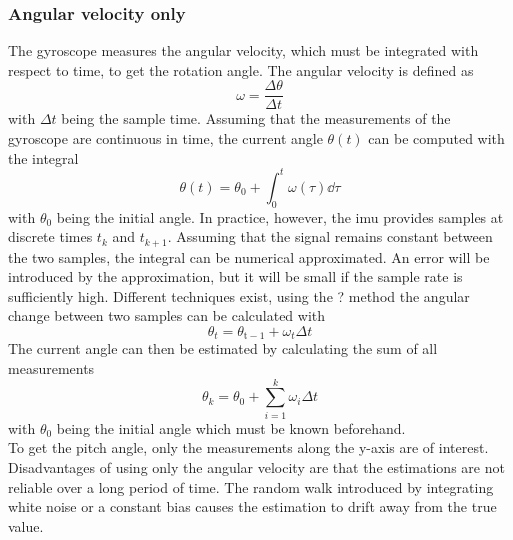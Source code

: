 \subsubsection{Angular velocity only}
\cite{Kok2017}
The gyroscope measures the angular velocity, which must be integrated with respect to time, to get the rotation angle.
The angular velocity is defined as
\begin{equation}
	\omega = \frac{\Delta\theta}{\Delta t}
\end{equation}
with $\Delta t$ being the sample time.
Assuming that the measurements of the gyroscope are continuous in time, the current angle $\theta(t)$ can be computed with the integral
\begin{equation}
	\theta(t) = \theta_0 + \int_0^t \omega(\tau)\dd{\tau}
\end{equation}
with $\theta_0$ being the initial angle.
In practice, however, the \gls{imu} provides samples at discrete times $t_k$ and $t_{k+1}$.
Assuming that the signal remains constant between the two samples, the integral can be numerical approximated.
An error will be introduced by the approximation, but it will be small if the sample rate is sufficiently high.
Different techniques exist, using the ? method the angular change between two samples can be calculated with
\begin{equation}
	\theta_t = \theta_\mathrm{t - 1} + \omega_t\Delta t
\end{equation}
The current angle can then be estimated by calculating the sum of all measurements
\begin{equation}
	\theta_k = \theta_0 + \sum_{i = 1}^k \omega_i \Delta t
\end{equation}
with $\theta_0$ being the initial angle which must be known beforehand.\\
To get the pitch angle, only the measurements along the y-axis are of interest.
Disadvantages of using only the angular velocity are that the estimations are not reliable over a long period of time.
The random walk introduced by integrating white noise or a constant bias causes the estimation to drift away from the true value.


